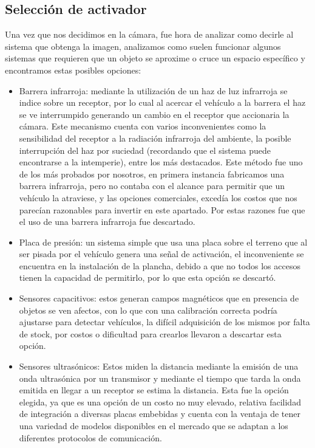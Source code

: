 \subsection{Selección de activador}
Una vez que nos decidimos en la cámara, fue hora de analizar como decirle al sistema que obtenga la imagen, analizamos como suelen funcionar 
algunos sistemas que requieren que un objeto se aproxime o cruce un espacio específico y encontramos estas posibles opciones:

\begin{itemize}
\item Barrera infrarroja: mediante la utilización de un haz de luz infrarroja se indice sobre un receptor, por  lo cual al acercar el vehículo a
la barrera el haz se ve interrumpido generando un cambio en el receptor que accionaria la cámara. Este mecanismo cuenta con varios inconvenientes 
como la sensibilidad del receptor a la radiación infrarroja del ambiente, la posible interrupción del haz por suciedad (recordando que el 
sistema puede encontrarse a la intemperie), entre los  más destacados. Este método fue uno de los más probados por nosotros, en primera instancia
fabricamos una barrera infrarroja, pero no contaba con el alcance para permitir que un vehículo la atraviese, y las opciones comerciales, excedía
los costos que nos parecían razonables para invertir en este apartado. Por estas razones fue que el uso de una barrera infrarroja fue descartado.

\item Placa de presión: un sistema simple que usa una placa sobre el terreno que al ser pisada por el vehículo 
genera una señal de activación, el inconveniente se encuentra en la instalación de la plancha, debido a que no todos 
los accesos tienen la capacidad de permitirlo, por lo que esta opción se descartó.

\item Sensores capacitivos: estos generan campos magnéticos que en presencia de objetos se ven afectos, con lo 
que con una calibración correcta podría ajustarse para detectar vehículos, la difícil adquisición de los mismos por falta de stock, por costos o 
dificultad para crearlos llevaron a descartar esta opción.

\item Sensores ultrasónicos: Estos miden la distancia mediante la emisión de una onda ultrasónica por un transmisor y 
mediante el tiempo que tarda la onda emitida en llegar a un receptor se estima la distancia. Esta fue la opción elegida, ya que es una opción 
de un costo no muy elevado, relativa facilidad de integración a diversas placas embebidas y cuenta con la ventaja de tener una variedad de modelos
disponibles en el mercado que se adaptan a los diferentes protocolos de comunicación.
\end{itemize}
